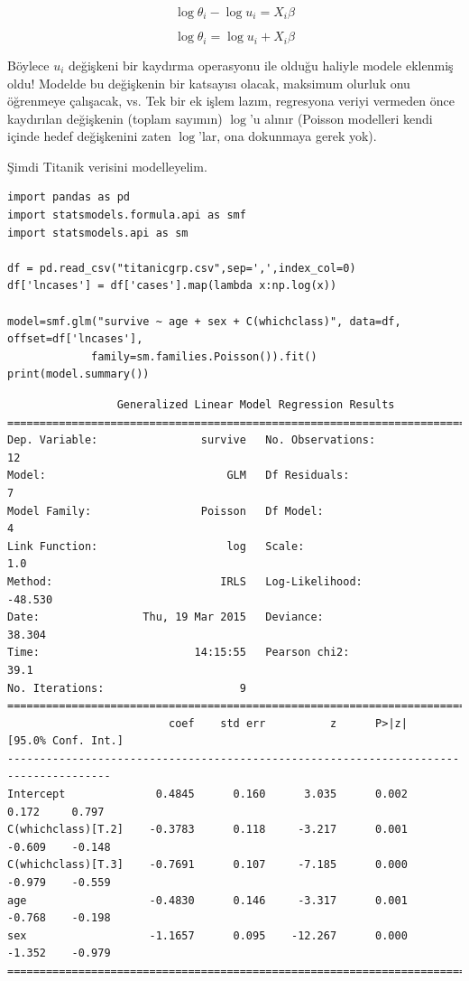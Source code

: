 \documentclass[12pt,fleqn]{article}\usepackage{../../common}
\begin{document}
$$ \log \theta_i -  \log u_i = X_i\beta $$

$$ \log \theta_i = \log u_i + X_i\beta $$

Böylece $u_i$ değişkeni bir kaydırma operasyonu ile olduğu haliyle modele
eklenmiş oldu! Modelde bu değişkenin bir katsayısı olacak, maksimum olurluk
onu öğrenmeye çalışacak, vs. Tek bir ek işlem lazım, regresyona veriyi
vermeden önce kaydırılan değişkenin (toplam sayımın) $\log$'u alınır
(Poisson modelleri kendi içinde hedef değişkenini zaten $\log$'lar, ona
dokunmaya gerek yok).

Şimdi Titanik verisini modelleyelim. 

\begin{verbatim}
import pandas as pd
import statsmodels.formula.api as smf
import statsmodels.api as sm

df = pd.read_csv("titanicgrp.csv",sep=',',index_col=0)
df['lncases'] = df['cases'].map(lambda x:np.log(x))

model=smf.glm("survive ~ age + sex + C(whichclass)", data=df, offset=df['lncases'],
             family=sm.families.Poisson()).fit()
print(model.summary())
\end{verbatim}

\begin{verbatim}
                 Generalized Linear Model Regression Results                  
==============================================================================
Dep. Variable:                survive   No. Observations:                   12
Model:                            GLM   Df Residuals:                        7
Model Family:                 Poisson   Df Model:                            4
Link Function:                    log   Scale:                             1.0
Method:                          IRLS   Log-Likelihood:                -48.530
Date:                Thu, 19 Mar 2015   Deviance:                       38.304
Time:                        14:15:55   Pearson chi2:                     39.1
No. Iterations:                     9                                         
======================================================================================
                         coef    std err          z      P>|z|      [95.0% Conf. Int.]
--------------------------------------------------------------------------------------
Intercept              0.4845      0.160      3.035      0.002         0.172     0.797
C(whichclass)[T.2]    -0.3783      0.118     -3.217      0.001        -0.609    -0.148
C(whichclass)[T.3]    -0.7691      0.107     -7.185      0.000        -0.979    -0.559
age                   -0.4830      0.146     -3.317      0.001        -0.768    -0.198
sex                   -1.1657      0.095    -12.267      0.000        -1.352    -0.979
======================================================================================
\end{verbatim}
\end{document}
